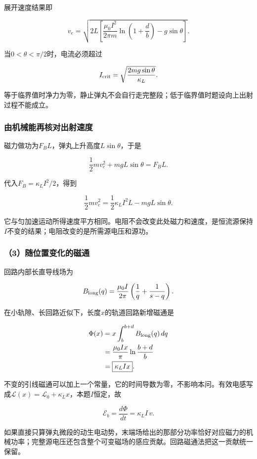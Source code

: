 \documentclass[12pt,a4paper,fontset=fandol]{ctexart}
\begin{document}
展开速度结果即

\[
\boxed{
v_e=\sqrt{2L\left[
\frac{\mu_0I^2}{2\pi m}\ln\left(1+\frac db\right)
-g\sin\theta\right]}}.
\]

当\(0<\theta<\pi/2\)时，电流必须超过

\[
I_{\rm crit}=
\sqrt{\frac{2mg\sin\theta}{\kappa_L}}.
\]

等于临界值时净力为零，静止弹丸不会自行走完整段；低于临界值时题设向上出射过程不能成立。

\subsubsection{由机械能再核对出射速度}\label{ux7531ux673aux68b0ux80fdux518dux6838ux5bf9ux51faux5c04ux901fux5ea6}

磁力做功为\(F_BL\)，弹丸上升高度\(L\sin\theta\)，于是

\[
\frac12mv_e^2+mgL\sin\theta=F_BL.
\]

代入\(F_B=\kappa_LI^2/2\)，得到

\[
\frac12mv_e^2
=\frac12\kappa_LI^2L-mgL\sin\theta.
\]

它与匀加速运动所得速度平方相同。电阻不会改变此处磁力和速度，是恒流源保持\(I\)不变的结果；电阻改变的是所需源电压和源功。

\subsubsection{（3）随位置变化的磁通}\label{ux968fux4f4dux7f6eux53d8ux5316ux7684ux78c1ux901a}

回路内部长直导线场为

\[
B_{\rm long}(q)=\frac{\mu_0I}{2\pi}
\left(\frac1q+\frac1{s-q}\right).
\]

在小轨隙、长回路近似下，长度\(x\)的轨道回路新增磁通是

\[
\begin{aligned}
\Phi(x)
&=x\int_b^{b+d} B_{\rm long}(q)\,dq\\
&=\frac{\mu_0Ix}{\pi}\ln\frac{b+d}{b}\\
&=\boxed{\kappa_LIx}.
\end{aligned}
\]

不变的引线磁通可以加上一个常量，它的时间导数为零，不影响本问。有效电感写成\(\mathcal L(x)=\mathcal L_0+\kappa_Lx\)，本题\(I\)恒定，故

\[
\boxed{\mathcal E_b=\frac{d\Phi}{dt}
=\kappa_LI\,v}.
\]

如果直接只算弹丸微段的动生电动势，末端场给出的那部分功率恰好对应磁力的机械功率；完整源电压还包含整个可变磁场的感应贡献。回路磁通法把这一贡献统一保留。
\end{document}
